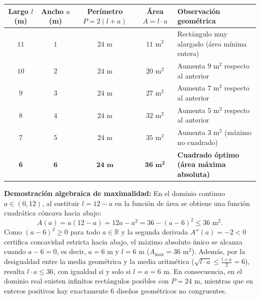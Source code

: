 \documentclass[spanish,letterpaper,oneside]{article}
\begin{document}
{\footnotesize{}\renewcommand{\arraystretch}{1.12}
\noindent\begin{tabularx}{\textwidth}{|c|c|c|c|>{\raggedright\arraybackslash}X|}\hline
\rowcolor{iiiepePale} \textbf{Largo $l$ (m)} & \textbf{Ancho $a$ (m)} & \textbf{Perímetro $P=2(l+a)$} & \textbf{Área $A=l\cdot a$} & \textbf{Observación geométrica} \\\hline
$11$ & $1$ & $24\text{ m}$ & $11\text{ m}^2$ & Rectángulo muy alargado (área mínima entera) \\\hline
$10$ & $2$ & $24\text{ m}$ & $20\text{ m}^2$ & Aumenta $9\text{ m}^2$ respecto al anterior \\\hline
$9$ & $3$ & $24\text{ m}$ & $27\text{ m}^2$ & Aumenta $7\text{ m}^2$ respecto al anterior \\\hline
$8$ & $4$ & $24\text{ m}$ & $32\text{ m}^2$ & Aumenta $5\text{ m}^2$ respecto al anterior \\\hline
$7$ & $5$ & $24\text{ m}$ & $35\text{ m}^2$ & Aumenta $3\text{ m}^2$ (máximo no cuadrado) \\\hline
$\mathbf{6}$ & $\mathbf{6}$ & $\mathbf{24\text{ m}}$ & $\mathbf{36\text{ m}^2}$ & \textbf{Cuadrado óptimo (área máxima absoluta)} \\\hline
\end{tabularx}}
\vspace{4pt}

\textbf{Demostración algebraica de maximalidad:} En el dominio continuo $a \in (0, 12)$, al sustituir $l = 12 - a$ en la función de área se obtiene una función cuadrática cóncava hacia abajo:
\[
A(a) = a(12 - a) = 12a - a^2 = 36 - (a - 6)^2 \le 36\text{ m}^2.
\]
Como $(a - 6)^2 \ge 0$ para todo $a \in \mathbb{R}$ y la segunda derivada $A''(a) = -2 < 0$ certifica concavidad estricta hacia abajo, el máximo absoluto único se alcanza cuando $a - 6 = 0$, es decir, $a = 6\text{ m}$ y $l = 6\text{ m}$ ($A_{\max} = 36\text{ m}^2$). Además, por la desigualdad entre la media geométrica y la media aritmética ($\sqrt{l\cdot a} \le \frac{l+a}{2} = 6$), resulta $l\cdot a \le 36$, con igualdad si y solo si $l = a = 6\text{ m}$. En consecuencia, en el dominio real existen infinitos rectángulos posibles con $P = 24\text{ m}$, mientras que en enteros positivos hay exactamente $6$ diseños geométricos no congruentes.

\begin{center}
\end{center}
\end{document}
